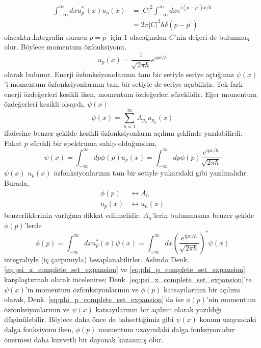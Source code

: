 \documentclass[a4paper,12pt, twoside]{article}
\begin{document}
\begin{equation}
\begin{aligned} 
\int _ { - \infty } ^ { \infty } d x u _ { p ^ { \prime } } ^ { * } ( x ) u _ { p } ( x ) 
& = | C | ^ { 2 } \int _ { - \infty } ^ { \infty } d x e ^ { i \left( p - p ^ { \prime } \right) x / \hbar } \\ 
& = 2 \pi | C | ^ { 2 } \hbar \delta \left( p - p ^ { \prime } \right) 
\end{aligned}
\end{equation}
olacaktır.İntegralin sonucu $p=p^\prime$ için $1$ olacağından $C$'nin değeri de bulunmuş olur. Böylece momentum özfonksiyonu,
\begin{equation}
u _ { p } ( x ) = \frac { 1 } { \sqrt { 2 \pi \hbar } } e ^ { i p x / \hbar }
\end{equation}
olarak bulunur. Enerji özfonksiyonolarının tam bir setiyle seriye açtığımız $\psi(x)$'i momentum özfonksiyonlarının tam bir setiyle de seriye açabiliriz. Tek fark enerji özdeğerleri kesikli iken, momentum özdeğerleri süreklidir. Eğer momentum özdeğerleri kesikli olsaydı, $\psi(x)$
\begin{equation}
\psi ( x ) = \sum _ { n = 1 } ^ { \infty } A _ { p_n } u _ {p_ n } ( x )
\end{equation}
ifadesine benzer şekilde kesikli özfonksiyonların açılımı şeklinde yazılabilirdi. Fakat $\hat p$ sürekli bir spektruma sahip olduğundan,
\begin{equation}
\psi ( x )  
= \int _ { - \infty } ^ { \infty } d p \phi ( p ) u_p(x)
= \int _ { - \infty } ^ { \infty } d p \phi ( p ) \frac { e ^ { i p x /\hbar } } { \sqrt { 2 \pi \hbar } }
\label{eq:psi_x_complete_set_expansion}
\end{equation}
$\psi(x)$ $u_p(x)$ özfonksiyonlarının tam bir setiyle yukarıdaki gibi yazılmalıdır. Burada,
\begin{align*}
\phi(p) &\leftrightarrow A_n \\
u_p(x)  &\leftrightarrow u_n(x) 
\end{align*}
benzerliklerinin varlığına dikkat edilmelidir. $A_n$'lerin bulunmasına benzer şekide $\phi(p)$'lerde
\begin{equation}
\phi ( p )
= \int _ { - \infty } ^ { \infty } d x u^\ast_p(x)  \psi ( x )
= \int _ { - \infty } ^ { \infty } d x \left( \frac { e ^ { i p x / \hbar } } { \sqrt { 2 \pi \hbar } } \right) ^ { * } \psi ( x )
\label{eq:phi_p_complete_set_expansion}
\end{equation}
integraliyle (iç çarpımıyla) hesaplanabilirler. Aslında Denk. \ref{eq:psi_x_complete_set_expansion} ve \ref{eq:phi_p_complete_set_expansion} karşılaştırmalı olarak incelenirse; Denk. \ref{eq:psi_x_complete_set_expansion}'te $\psi(x)$'in momentum özfonksiyonlarının ve $\phi(p)$ katsayılarının bir açılımı olarak, Denk. \ref{eq:phi_p_complete_set_expansion}'da ise $\phi(p)$'nin momentum özfonksiyonlarının ve $\psi(x)$ katsayılarının bir açılımı olarak yazıldığı düşünülebilir. Böylece daha önce de bahsettiğimiz gibi $\psi(x)$ konum uzayındaki dalga fonksiyonu iken, $\phi(p)$ momentum uzayındaki dalga fonksiyonudur önermesi daha kuvvetli bir dayanak kazanmış olur.
\end{document}
